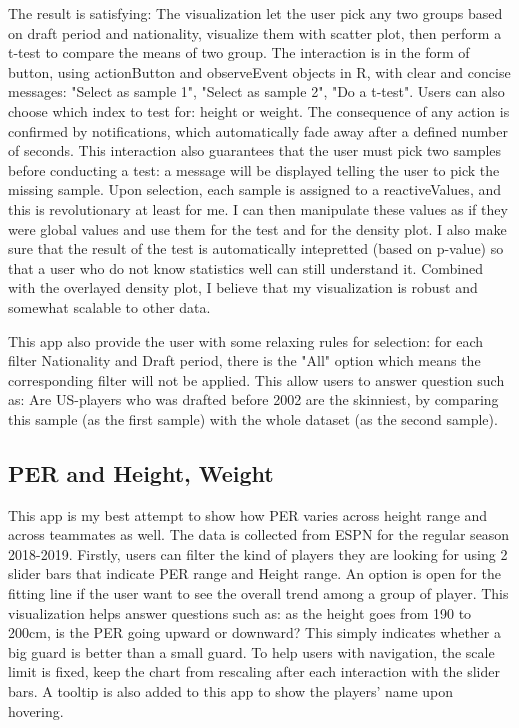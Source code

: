 \documentclass[a4paper,12pt,twoside]{article}
\numberwithin{equation}{section}
\begin{document}
The result is satisfying: The visualization let the user pick any two groups based on draft period and nationality, visualize  them with scatter plot, then perform a t-test to compare the means of two group. The interaction is in the form of button, using actionButton and observeEvent objects in R, with clear and concise messages: "Select as sample 1", "Select as sample 2", "Do a t-test". Users can also choose which index to test for: height or weight. The consequence of any action is confirmed by notifications, which automatically fade away after a defined number of seconds. This interaction also guarantees that the user must pick two samples before conducting a test: a message will be displayed telling the user to pick the missing sample. Upon selection, each sample is assigned to a reactiveValues, and this is revolutionary at least for me. I can then manipulate these values as if they were global values and use them for the test and for the density plot. I also make sure that the result of the test is automatically intepretted (based on p-value) so that a user who do not know statistics well can still understand it. Combined with the overlayed density plot, I believe that my visualization is robust and somewhat scalable to other data.

This app also provide the user with some relaxing rules for selection: for each filter Nationality and Draft period, there is the "All" option which means the corresponding filter will not be applied. This allow users to answer question such as: Are US-players who was drafted before 2002 are the skinniest, by comparing this sample (as the first sample) with the whole dataset (as the second sample).


\subsection{PER and Height, Weight}

This app is my best attempt to show how PER varies across height range and across teammates as well. The data is collected from ESPN for the regular season 2018-2019. Firstly, users can filter the kind of players they are looking for using 2 slider bars that indicate PER range and Height range. An option is open for the fitting line if the user want to see the overall trend among a group of player. This visualization helps answer questions such as: as the height goes from 190 to 200cm, is the PER going upward or downward? This simply indicates whether a big guard is better than a small guard. To help users with navigation, the scale limit is fixed, keep the chart from rescaling after each interaction with the slider bars. A tooltip is also added to this app to show the players' name upon hovering.
\end{document}
